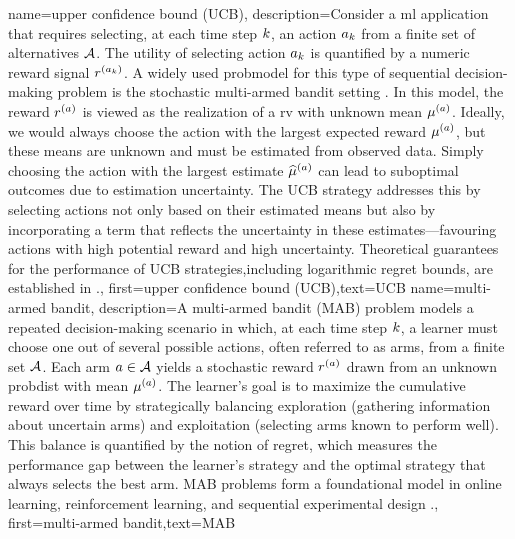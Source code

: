 {name={upper confidence bound (UCB)},
	description={Consider a \gls{ml} 
		application that requires selecting, at each time step $k$, an action $a_{k}$ 
		from a finite set of alternatives $\mathcal{A}$. The utility of selecting action $a_{k}$ 
		is quantified by a numeric \gls{reward} signal $r^{(a_{k})}$. 
		A widely used \gls{probmodel} for this type of sequential decision-making problem 
		is the stochastic multi-armed bandit setting \cite{Bubeck2012}. In this model, 
		the reward $r^{(a)}$ is viewed as the \gls{realization} of a \gls{rv} 
		with unknown \gls{mean} $\mu^{(a)}$. Ideally, we would always choose the 
		action with the largest expected \gls{reward} $\mu^{(a)}$, but these 
		means are unknown and must be estimated from observed \gls{data}. Simply 
		choosing the action with the largest estimate $\widehat{\mu}^{(a)}$ can 
		lead to suboptimal outcomes due to estimation uncertainty. The UCB strategy 
		addresses this by selecting actions not only based on their estimated means but 
		also by incorporating a term that reflects the uncertainty in these estimates—favouring 
		actions with high potential reward and high uncertainty. Theoretical guarantees 
		for the performance of UCB strategies,including logarithmic regret bounds, are established in \cite{Bubeck2012}.},
	first={upper confidence bound (UCB)},text={UCB} 
}
{name={multi-armed bandit},
	description={A multi-armed bandit (MAB) problem models 
		a repeated decision-making scenario in which, at each time step $k$, a learner must 
		choose one out of several possible actions, often referred to as arms, from a finite 
		set $\mathcal{A}$. Each arm $a \in \mathcal{A}$ yields a stochastic \gls{reward} $r^{(a)}$ 
		drawn from an unknown \gls{probdist} with \gls{mean} $\mu^{(a)}$. 
		The learner’s goal is to maximize the cumulative \gls{reward} over time by 
		strategically balancing exploration (gathering information about 
		uncertain arms) and exploitation (selecting arms known to perform well). 
		This balance is quantified by the notion of \gls{regret}, which measures the performance 
		gap between the learner's strategy and the optimal strategy that always selects the best arm. 
		MAB problems form a foundational model in online learning, reinforcement learning, 
		and sequential experimental design \cite{Bubeck2012}.},
	first={multi-armed bandit},text={MAB}
}



